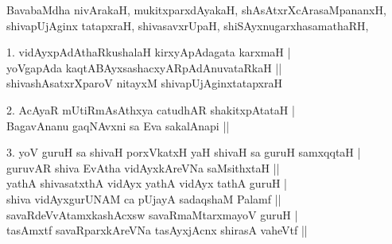 \begin{entry}
\medskip

\begin{shl}
BavabaMdha nivArakaH, mukitxparxdAyakaH, shAsAtxrXcArasaMpananxH,\\[1pt]
shivapUjAginx tatapxraH, shivasavxrUpaH, shiSAyxnugarxhasamathaRH,
\end{shl}
\smallskip
\begin{shl}
1. vidAyxpAdAthaRkushalaH kirxyApAdagata karxmaH |\\[1pt]
yoVgapAda kaqtABAyxsashacxyARpAdAnuvataRkaH ||\\[1pt]
shivashAsatxrXparoV nitayxM shivapUjAginxtatapxraH
\end{shl}
\smallskip
\begin{shl}
2. AcAyaR mUtiRmAsAthxya catudhAR shakitxpAtataH |\\[1pt]
BagavAnanu gaqNAvxni sa Eva sakalAnapi ||
\end{shl}
\smallskip
\begin{shl}
3. yoV guruH sa shivaH porxVkatxH yaH shivaH sa guruH samxqqtaH |\\[1pt]
guruvAR shiva EvAtha vidAyxkAreVNa saMsithxtaH ||\\[1pt]
yathA shivasatxthA vidAyx yathA vidAyx tathA guruH |\\[1pt]
shiva vidAyxgurUNAM ca pUjayA sadaqshaM Palamf ||\\[1pt]
savaRdeVvAtamxkashAcxsw savaRmaMtarxmayoV guruH |\\[1pt]
tasAmxtf savaRparxkAreVNa tasAyxjAcnx shirasA vaheVtf ||
\end{shl}
\smallskip
{}
\end{entry}


